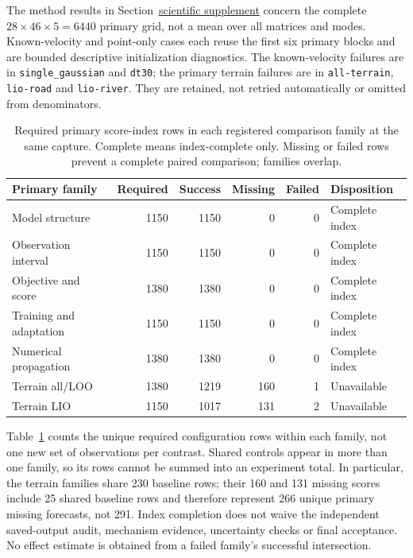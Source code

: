 The method results in Section~\href{supplement.pdf\#sec:method-results}{scientific supplement} concern the complete $28\times46\times5=6440$
primary grid, not a mean over all matrices and modes. Known-velocity and
point-only cases each reuse the first six primary blocks and are bounded
descriptive initialization diagnostics. The known-velocity failures are in
\texttt{single\_gaussian} and \texttt{dt30}; the primary terrain failures are
in \texttt{all-terrain}, \texttt{lio-road} and \texttt{lio-river}.
They are retained, not retried automatically or omitted from denominators.

\begin{table}[htbp]
\centering\small
\caption{Required primary score-index rows in each registered comparison
family at the same capture. Complete means index-complete only. Missing or
failed rows prevent a complete paired comparison; families overlap.}
\label{tab:family-coverage}\hypertarget{tab:family-coverage}{}
\begin{tabular}{@{}lrrrrl@{}}
\toprule
Primary family & Required & Success & Missing & Failed & Disposition\\
\midrule
Model structure & 1150 & 1150 & 0 & 0 & Complete index\\
Observation interval & 1150 & 1150 & 0 & 0 & Complete index\\
Objective and score & 1380 & 1380 & 0 & 0 & Complete index\\
Training and adaptation & 1150 & 1150 & 0 & 0 & Complete index\\
Numerical propagation & 1380 & 1380 & 0 & 0 & Complete index\\
Terrain all/LOO & 1380 & 1219 & 160 & 1 & Unavailable\\
Terrain LIO & 1150 & 1017 & 131 & 2 & Unavailable\\
\bottomrule
\end{tabular}
\end{table}

Table~\ref{tab:family-coverage} counts the unique required configuration rows
within each family, not one new set of observations per contrast. Shared
controls appear in more than one family, so its rows cannot be summed into
an experiment total. In particular, the terrain families share 230 baseline
rows; their 160 and 131 missing scores include 25 shared baseline rows and
therefore represent 266 unique primary missing forecasts, not 291.
Index completion does not waive the independent saved-output audit,
mechanism evidence, uncertainty checks or final acceptance. No effect
estimate is obtained from a failed family's successful intersection.

